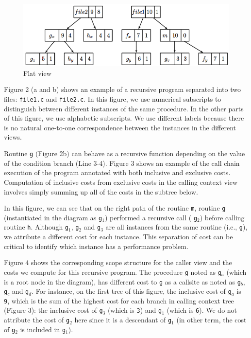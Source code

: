 \documentclass[a4paper,11pt]{article}
\begin{document}
\begin{center}
\begin{figure}
\caption{Flat view} 
\includegraphics{images/metrics-ft.png}
\end{figure}

\end{center}

 Figure 2 (a and b) shows an example of a recursive program separated into two files: 
\texttt{file1.c} and \texttt{file2.c}.  In this figure, we use numerical subscripts to distinguish between different instances of the same procedure. In the other parts of this figure, we use alphabetic subscripts.  We use different labels because there is no natural one-to-one correspondence between the instances in the different views.  

 Routine \texttt{g} (Figure 2b) can behave as a recursive function depending on the value of the condition branch (Line 3-4). Figure 3 shows an example of the call chain execution of the program annotated with both inclusive and exclusive costs. Computation of inclusive costs from exclusive costs in the calling context view involves simply summing up all of the costs in the subtree below. 

 In this figure, we can see that on the right path of the routine 
\texttt{m}, routine 
\texttt{g} (instantiated in the diagram as 
\texttt{g$_1$}) performed a recursive call (
\texttt{g$_2$}) before calling routine 
\texttt{h}. Although 
\texttt{g$_1$}, 
\texttt{g$_2$} and 
\texttt{g$_3$} are all instances from the same routine (i.e., 
\texttt{g}), we attribute  a different cost for each instance. This separation of cost can be critical to identify which instance has a performance problem.  

 Figure 4 shows the corresponding scope structure for the caller view and the costs we compute for this recursive program. The procedure 
\texttt{g} noted as 
\texttt{g$_a$} (which is a root node in the diagram), has different cost to 
\texttt{g} as a callsite as noted as 
\texttt{g$_b$}, 
\texttt{g$_c$} and 
\texttt{g$_d$}.  For instance, on the first tree of this figure, the inclusive cost of  
\texttt{g$_a$} is 
\texttt{9}, which is the sum of the highest  cost for each branch in calling context tree (Figure 3):  the inclusive cost of  
\texttt{g$_3$} (which is 
\texttt{3}) and 
\texttt{g$_1$} (which is 
\texttt{6}). We do not attribute the cost of 
\texttt{g$_2$} here since it is a descendant of 
\texttt{g$_1$} (in other term, the cost of 
\texttt{g$_2$} is included in 
\texttt{g$_1$}).   
\end{document}
